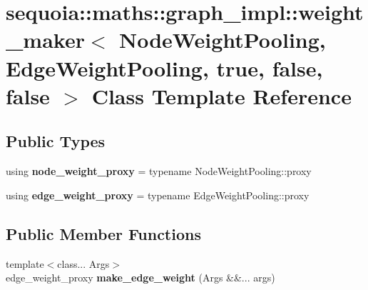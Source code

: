 \hypertarget{classsequoia_1_1maths_1_1graph__impl_1_1weight__maker_3_01_node_weight_pooling_00_01_edge_weightf3288a9dc2dbbbb7cec12cb6a57911c5}{}\section{sequoia\+::maths\+::graph\+\_\+impl\+::weight\+\_\+maker$<$ Node\+Weight\+Pooling, Edge\+Weight\+Pooling, true, false, false $>$ Class Template Reference}
\label{classsequoia_1_1maths_1_1graph__impl_1_1weight__maker_3_01_node_weight_pooling_00_01_edge_weightf3288a9dc2dbbbb7cec12cb6a57911c5}
\subsection*{Public Types}
\begin{DoxyCompactItemize}
\item 
\mbox{\label{classsequoia_1_1maths_1_1graph__impl_1_1weight__maker_3_01_node_weight_pooling_00_01_edge_weightf3288a9dc2dbbbb7cec12cb6a57911c5_a9c705d8c4363553a53160700aa95f077}} 
using {\bfseries node\+\_\+weight\+\_\+proxy} = typename Node\+Weight\+Pooling\+::proxy
\item 
\mbox{\label{classsequoia_1_1maths_1_1graph__impl_1_1weight__maker_3_01_node_weight_pooling_00_01_edge_weightf3288a9dc2dbbbb7cec12cb6a57911c5_a3b37a297700c7aa7a4f6b72fd9c7d1f5}} 
using {\bfseries edge\+\_\+weight\+\_\+proxy} = typename Edge\+Weight\+Pooling\+::proxy
\end{DoxyCompactItemize}
\subsection*{Public Member Functions}
\begin{DoxyCompactItemize}
\item 
\mbox{\label{classsequoia_1_1maths_1_1graph__impl_1_1weight__maker_3_01_node_weight_pooling_00_01_edge_weightf3288a9dc2dbbbb7cec12cb6a57911c5_aedc7e15d4404d897d33cb55624514dcf}} 
{\footnotesize template$<$class... Args$>$ }\\edge\+\_\+weight\+\_\+proxy {\bfseries make\+\_\+edge\+\_\+weight} (Args \&\&... args)
\end{DoxyCompactItemize}
